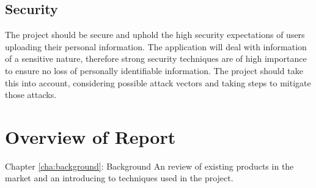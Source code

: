 \subsection{Security}
The project should be secure and uphold the high security expectations of users uploading their personal information.
%
The application will deal with information of a sensitive nature, therefore strong security techniques are of high importance to ensure no loss of personally identifiable information. 
% 
The project should take this into account, considering possible attack vectors and taking steps to mitigate those attacks.

\section{Overview of Report}

Chapter \ref{cha:background}: Background 
An review of existing products in the market and an introducing to techniques used in the project.

